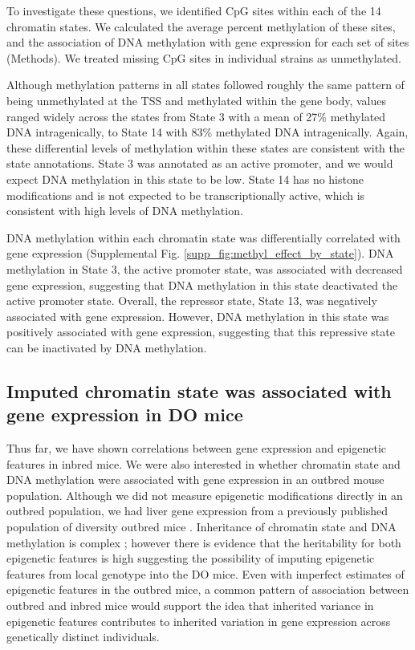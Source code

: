 \documentclass[
  11pt,
]{article}
\begin{document}
To investigate these questions, we identified CpG sites within each of
the 14 chromatin states. We calculated the average percent methylation
of these sites, and the association of DNA methylation with gene
expression for each set of sites (Methods). We treated missing CpG sites
in individual strains as unmethylated.

Although methylation patterns in all states followed roughly the same
pattern of being unmethylated at the TSS and methylated within the gene
body, values ranged widely across the states from State 3 with a mean of
27\% methylated DNA intragenically, to State 14 with 83\% methylated DNA
intragenically. Again, these differential levels of methylation within
these states are consistent with the state annotations. State 3 was
annotated as an active promoter, and we would expect DNA methylation in
this state to be low. State 14 has no histone modifications and is not
expected to be transcriptionally active, which is consistent with high
levels of DNA methylation.

DNA methylation within each chromatin state was differentially
correlated with gene expression (Supplemental Fig.
\ref{supp_fig:methyl_effect_by_state}). DNA methylation in State 3, the
active promoter state, was associated with decreased gene expression,
suggesting that DNA methylation in this state deactivated the active
promoter state. Overall, the repressor state, State 13, was negatively
associated with gene expression. However, DNA methylation in this state
was positively associated with gene expression, suggesting that this
repressive state can be inactivated by DNA methylation.

\hypertarget{imputed-chromatin-state-was-associated-with-gene-expression-in-do-mice}{%
\subsection{Imputed chromatin state was associated with gene expression
in DO
mice}\label{imputed-chromatin-state-was-associated-with-gene-expression-in-do-mice}}

Thus far, we have shown correlations between gene expression and
epigenetic features in inbred mice. We were also interested in whether
chromatin state and DNA methylation were associated with gene expression
in an outbred mouse population. Although we did not measure epigenetic
modifications directly in an outbred population, we had liver gene
expression from a previously published population of diversity outbred
mice \citep{pmid28592500}. Inheritance of chromatin state and DNA
methylation is complex \citep{rintisch2014natural}; however there is
evidence that the heritability for both epigenetic features is high
\citep{pmid16009939,pmid33931130} suggesting the possibility of imputing
epigenetic features from local genotype into the DO mice. Even with
imperfect estimates of epigenetic features in the outbred mice, a common
pattern of association between outbred and inbred mice would support the
idea that inherited variance in epigenetic features contributes to
inherited variation in gene expression across genetically distinct
individuals.
\end{document}
